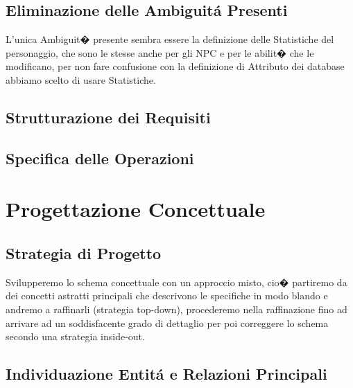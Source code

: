 \documentclass[12pt]{article} %
\begin{document}
		\subsection{Eliminazione delle Ambiguit\'{a} Presenti}

		L'unica Ambiguit� presente sembra essere la definizione delle Statistiche del personaggio, che sono le stesse anche per gli NPC e per le abilit� che le modificano, per non fare confusione con la definizione di Attributo dei database abbiamo scelto di usare Statistiche.



		\subsection{Strutturazione dei Requisiti}

		

		\subsection{Specifica delle Operazioni}

		

		\newpage
	\section{Progettazione Concettuale}


		\subsection{Strategia di Progetto }
			Svilupperemo lo schema concettuale con un approccio misto, cio� partiremo da dei concetti astratti principali che descrivono le specifiche in modo blando e andremo a raffinarli (strategia top-down), procederemo nella raffinazione fino ad arrivare ad un soddisfacente grado di dettaglio per poi correggere lo schema secondo una strategia inside-out.


		\subsection{Individuazione Entit\'{a} e Relazioni Principali}

		
\end{document}
